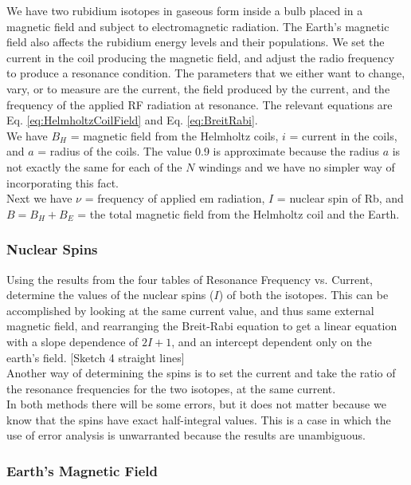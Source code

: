 \documentclass{../lab}
\begin{document}
We have two rubidium isotopes in gaseous form inside a bulb placed in a magnetic field and subject to electromagnetic radiation. The Earth's magnetic field also affects the rubidium energy levels and their populations. We set the current in the coil producing the magnetic field, and adjust the radio frequency to produce a resonance condition. The parameters that we either want to change, vary, or to measure are the current, the field produced by the current, and the frequency of the applied RF radiation at resonance. The relevant equations are Eq. \ref{eq:HelmholtzCoilField} and Eq. \ref{eq:BreitRabi}. \\

We have $B_{H}$ = magnetic field from the Helmholtz coils, $i$ = current in the coils, and $a$ = radius of the coils. The value 0.9 is approximate because the radius $a$ is not exactly the same for each of the $N$ windings and we have no simpler way of incorporating this fact. \\

Next we have $\nu$ = frequency of applied em radiation, $I$ = nuclear spin of Rb, and $B = B_{H} + B_{E}$ = the total magnetic field from the Helmholtz coil and the Earth.

\subsubsection{Nuclear Spins}

Using the results from the four tables of Resonance Frequency vs. Current, determine the values of the nuclear spins ($I$) of both the isotopes. This can be accomplished by looking at the same current value, and thus same external magnetic field, and rearranging the Breit-Rabi equation to get a linear equation with a slope dependence of $2I + 1$, and an intercept dependent only on the earth's field. [Sketch 4 straight lines] \\

Another way of determining the spins is to set the current and take the ratio of the resonance frequencies for the two isotopes, at the same current. \\

In both methods there will be some errors, but it does not matter because we know that the spins have exact half-integral values. This is a case in which the use of error analysis is unwarranted because the results are unambiguous.

\subsubsection{Earth's Magnetic Field}
\end{document}
